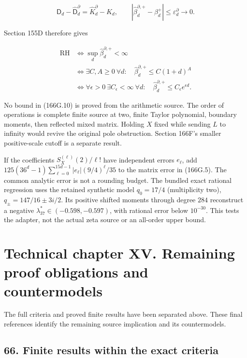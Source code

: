 \documentclass[
  11pt,
]{book}
\begin{document}
\[
 \mathsf D_d-\widehat{\mathsf D}_d^\partial=\widehat K_d^\partial-K_d,
 \qquad |\widehat\beta_d^{\partial,+}-\beta_d^+|
 \le\varepsilon_d^\partial\longrightarrow0.
\tag{166G.9}
\]

Section 155D therefore gives

\[
\boxed{\begin{aligned}
\mathrm{RH}&\iff\sup_d\widehat\beta_d^{\partial,+}<\infty\\
&\iff\exists C,A\ge0\ \forall d:\quad
 \widehat\beta_d^{\partial,+}\le C(1+d)^A\\
&\iff\forall\epsilon>0\ \exists C_\epsilon<\infty\ \forall d:\quad
 \widehat\beta_d^{\partial,+}\le C_\epsilon e^{\epsilon d}.
\end{aligned}}
\tag{166G.10}
\]

No bound in (166G.10) is proved from the arithmetic source. The order of
operations is complete finite source at two, finite Taylor polynomial,
boundary moments, then reflected mixed matrix. Holding \(X\) fixed while
sending \(L\) to infinity would revive the original pole obstruction.
Section 166F's smaller positive-scale cutoff is a separate result.

If the coefficients \(S_X^{(\ell)}(2)/\ell!\) have independent errors
\(e_\ell\), add
\(125(36^d-1)\sum_{\ell=0}^{15d-1}|e_\ell|(9/4)^\ell/35\) to the matrix
error in (166G.5). The common analytic error is not a rounding budget.
The bundled exact rational regression uses the retained synthetic model
\(q_0=17/4\) (multiplicity two), \(q_\pm=147/16\pm3i/2\). Its positive
shifted moments through degree \(284\) reconstruct a negative
\(\lambda_{37}^*\in(-0.598,-0.597)\), with rational error below
\(10^{-30}\). This tests the adapter, not the actual zeta source or an
all-order upper bound.

\chapter{Technical chapter XV. Remaining proof obligations and
countermodels}\label{technical-chapter-xv.-remaining-proof-obligations-and-countermodels}

The full criteria and proved finite results have been separated above.
These final references identify the remaining source implication and its
countermodels.

\section{66. Finite results within the exact
criteria}\label{finite-results-within-the-exact-criteria}
\end{document}
